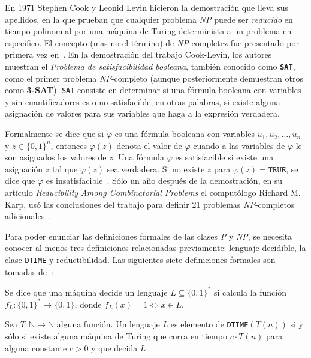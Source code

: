 En 1971 Stephen Cook y Leonid Levin hicieron la demostración que lleva sus
apellidos, en la que prueban que cualquier problema \textsl{NP} puede
ser \textit{reducido} en tiempo polinomial por una máquina de Turing
determinista a un problema en específico. El concepto
(mas no el término) de \textsl{NP}-completez fue presentado por primera
vez en~\cite{Cook}.
En la demostración del trabajo Cook-Levin, los autores muestran el
\textit{Problema de satisfacibilidad booleana}, también conocido como
\texttt{\textbf{SAT}}, como el primer problema \textsl{NP}-completo (aunque posteriormente 
demuestran otros como \textbf{3-SAT}).
\texttt{SAT} consiste en determinar si una fórmula booleana con variables y sin cuantificadores es o
no satisfacible; en otras palabras, si existe
alguna asignación de valores para sus variables que haga a la expresión
verdadera.

Formalmente se dice que si $\varphi$ es una fórmula booleana con
variables $u_{1}, u_{2}, \ldots, u_{n}$ y $z \in \{0,1\}^{n}$, entonces
$\varphi(z)$ denota el valor de $\varphi$ cuando a las variables de $\varphi$
le son asignados los valores de $z$. Una fórmula $\varphi$ es satisfacible si
existe una asignación $z$ tal que $\varphi(z)$ sea verdadera. Si no existe
$z$ para $\varphi(z) = \texttt{TRUE}$, se dice que $\varphi$ es
insatisfacible~\cite{arora2009computational}. Sólo un año después de la
demostración, en su artículo \textit{Reducibility Among Combinatorial Problems} el computólogo
Richard M. Karp, usó las conclusiones del trabajo para definir 21 problemas
\textsl{NP}-completos adicionales~\cite{Karp1972}.

Para poder enunciar las definiciones formales de las clases \textsl{P} y \textsl{NP},
se necesita conocer al menos tres definiciones relacionadas previamente:
lenguaje decidible, la clase \texttt{DTIME} y reductibilidad. Las siguientes
siete definiciones formales son tomadas de~\cite{arora2009computational}:



\theoremstyle{definition}
 \begin{definition}
  Se dice que una máquina decide un lenguaje $L \subseteq \{0, 1\}^{*}$ si
 calcula la función $f_{L}:\{0,1\}^{*} \longrightarrow \{0,1\}$, donde
 $f_{L} (x) = 1 \Leftrightarrow x \in L$.
\end{definition}

 \theoremstyle{definition}
 \begin{definition}
  Sea $T: \mathbb{N} \longrightarrow \mathbb{N}$
 alguna función. Un lenguaje \textsl{L} es elemento de \texttt{DTIME}$(T(n))$ si y sólo
 si existe alguna máquina de Turing que corra en tiempo $c \cdot T(n)$ para alguna
 constante $c > 0$ y que decida $L$.
 \end{definition}


